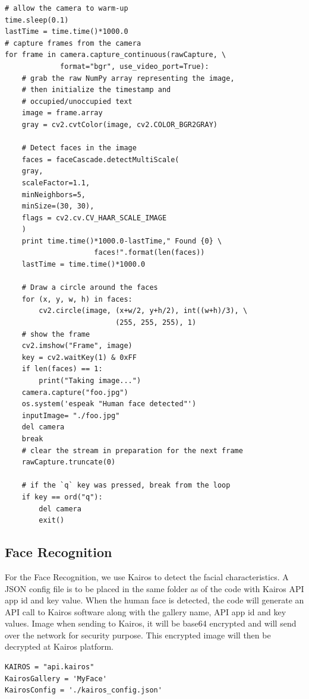 \documentclass[sigconf]{acmart}
\begin{document}
\begin{verbatim}
# allow the camera to warm-up
time.sleep(0.1)
lastTime = time.time()*1000.0
# capture frames from the camera
for frame in camera.capture_continuous(rawCapture, \ 
             format="bgr", use_video_port=True):
	# grab the raw NumPy array representing the image, 
	# then initialize the timestamp and 
	# occupied/unoccupied text
    image = frame.array
    gray = cv2.cvtColor(image, cv2.COLOR_BGR2GRAY)
    
    # Detect faces in the image
    faces = faceCascade.detectMultiScale(
    gray,
    scaleFactor=1.1,
    minNeighbors=5,
    minSize=(30, 30),
    flags = cv2.cv.CV_HAAR_SCALE_IMAGE
    )
    print time.time()*1000.0-lastTime," Found {0} \ 
                     faces!".format(len(faces))
    lastTime = time.time()*1000.0

    # Draw a circle around the faces
    for (x, y, w, h) in faces:
        cv2.circle(image, (x+w/2, y+h/2), int((w+h)/3), \ 
                          (255, 255, 255), 1)
    # show the frame
    cv2.imshow("Frame", image)
    key = cv2.waitKey(1) & 0xFF
    if len(faces) == 1:
        print("Taking image...")
	camera.capture("foo.jpg")
	os.system('espeak "Human face detected"')
	inputImage= "./foo.jpg"
	del camera
	break 
	# clear the stream in preparation for the next frame
    rawCapture.truncate(0)
    
	# if the `q` key was pressed, break from the loop
    if key == ord("q"):
        del camera
        exit()
\end{verbatim}


\subsection{Face Recognition}
For the Face Recognition, we use Kairos to detect the facial characteristics. A JSON config file is to be placed in the same folder as of the code with Kairos API app id and key value. When the human face is detected, the code will generate an API call to Kairos software along with the gallery name, API app id and key values. Image when sending to Kairos, it will be base64 encrypted and will send over the network for security purpose. This encrypted image will then be decrypted at Kairos platform.


\begin{verbatim}
KAIROS = "api.kairos"
KairosGallery = 'MyFace'
KairosConfig = './kairos_config.json'
\end{verbatim}
\end{document}
